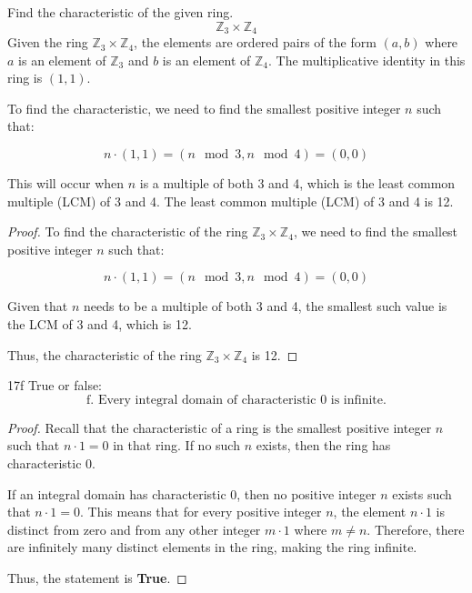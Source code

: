 \documentclass[12pt]{amsart}
\theoremstyle{definition}
\numberwithin{equation}{section}
\theoremstyle{plain}
\newcommand{\Z}{\mathbb{Z}}
\begin{document}
\vspace*{20pt}
\begin{exercise}{9} Find the characteristic of the given ring. \[ \Z_3 \times \Z_4\]
    Given the ring \( \Z_3 \times \Z_4 \), the elements are ordered pairs of the form \((a, b)\) where \( a \) is an element of \( \Z_3 \) and \( b \) is an element of \( \Z_4 \). The multiplicative identity in this ring is \( (1, 1) \).
    
    To find the characteristic, we need to find the smallest positive integer \( n \) such that:
    
    \[ n \cdot (1, 1) = (n \mod 3, n \mod 4) = (0, 0) \]
    
    This will occur when \( n \) is a multiple of both 3 and 4, which is the least common multiple (LCM) of 3 and 4.
    The least common multiple (LCM) of 3 and 4 is 12.
    
    \begin{proof}
    To find the characteristic of the ring \( \Z_3 \times \Z_4 \), we need to find the smallest positive integer \( n \) such that:
    
    \[ n \cdot (1, 1) = (n \mod 3, n \mod 4) = (0, 0) \]
    
    Given that \( n \) needs to be a multiple of both 3 and 4, the smallest such value is the LCM of 3 and 4, which is 12.
    
    Thus, the characteristic of the ring \( \Z_3 \times \Z_4 \) is 12.
    \end{proof}
\end{exercise}
\vspace*{20pt}
\begin{exercise}{17f} True or false:\\
    \[\text{f. Every integral domain of characteristic $0$ is infinite.}\]    
    \begin{proof}
    Recall that the characteristic of a ring is the smallest positive integer \( n \) such that \( n \cdot 1 = 0 \) in that ring. If no such \( n \) exists, then the ring has characteristic \(0\).
    
    If an integral domain has characteristic \(0\), then no positive integer \( n \) exists such that \( n \cdot 1 = 0 \). This means that for every positive integer \( n \), the element \( n \cdot 1 \) is distinct from zero and from any other integer \( m \cdot 1 \) where \( m \neq n \). Therefore, there are infinitely many distinct elements in the ring, making the ring infinite.
    
    Thus, the statement is \textbf{True}.
    \end{proof}
    
\end{exercise}
\end{document}
